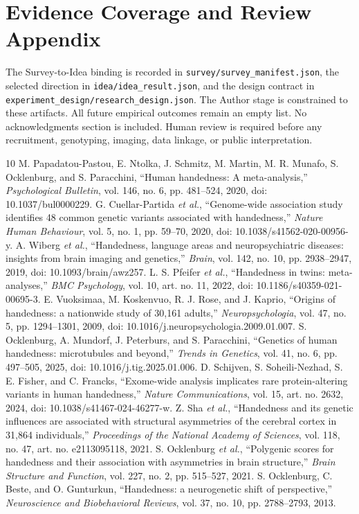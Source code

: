 \documentclass[10pt,conference]{IEEEtran}
\begin{document}
\section{Evidence Coverage and Review Appendix}
The Survey-to-Idea binding is recorded in \texttt{survey/survey\_manifest.json}, the selected direction in \texttt{idea/idea\_result.json}, and the design contract in \texttt{experiment\_design/research\_design.json}. The Author stage is constrained to these artifacts. All future empirical outcomes remain an empty list. No acknowledgments section is included. Human review is required before any recruitment, genotyping, imaging, data linkage, or public interpretation.

\begin{thebibliography}{10}
 M. Papadatou-Pastou, E. Ntolka, J. Schmitz, M. Martin, M. R. Munafo, S. Ocklenburg, and S. Paracchini, ``Human handedness: A meta-analysis,'' \textit{Psychological Bulletin}, vol. 146, no. 6, pp. 481--524, 2020, doi: 10.1037/bul0000229.
 G. Cuellar-Partida \textit{et al.}, ``Genome-wide association study identifies 48 common genetic variants associated with handedness,'' \textit{Nature Human Behaviour}, vol. 5, no. 1, pp. 59--70, 2020, doi: 10.1038/s41562-020-00956-y.
 A. Wiberg \textit{et al.}, ``Handedness, language areas and neuropsychiatric diseases: insights from brain imaging and genetics,'' \textit{Brain}, vol. 142, no. 10, pp. 2938--2947, 2019, doi: 10.1093/brain/awz257.
 L. S. Pfeifer \textit{et al.}, ``Handedness in twins: meta-analyses,'' \textit{BMC Psychology}, vol. 10, art. no. 11, 2022, doi: 10.1186/s40359-021-00695-3.
 E. Vuoksimaa, M. Koskenvuo, R. J. Rose, and J. Kaprio, ``Origins of handedness: a nationwide study of 30,161 adults,'' \textit{Neuropsychologia}, vol. 47, no. 5, pp. 1294--1301, 2009, doi: 10.1016/j.neuropsychologia.2009.01.007.
 S. Ocklenburg, A. Mundorf, J. Peterburs, and S. Paracchini, ``Genetics of human handedness: microtubules and beyond,'' \textit{Trends in Genetics}, vol. 41, no. 6, pp. 497--505, 2025, doi: 10.1016/j.tig.2025.01.006.
 D. Schijven, S. Soheili-Nezhad, S. E. Fisher, and C. Francks, ``Exome-wide analysis implicates rare protein-altering variants in human handedness,'' \textit{Nature Communications}, vol. 15, art. no. 2632, 2024, doi: 10.1038/s41467-024-46277-w.
 Z. Sha \textit{et al.}, ``Handedness and its genetic influences are associated with structural asymmetries of the cerebral cortex in 31,864 individuals,'' \textit{Proceedings of the National Academy of Sciences}, vol. 118, no. 47, art. no. e2113095118, 2021.
 S. Ocklenburg \textit{et al.}, ``Polygenic scores for handedness and their association with asymmetries in brain structure,'' \textit{Brain Structure and Function}, vol. 227, no. 2, pp. 515--527, 2021.
 S. Ocklenburg, C. Beste, and O. Gunturkun, ``Handedness: a neurogenetic shift of perspective,'' \textit{Neuroscience and Biobehavioral Reviews}, vol. 37, no. 10, pp. 2788--2793, 2013.
\end{thebibliography}
\end{document}
